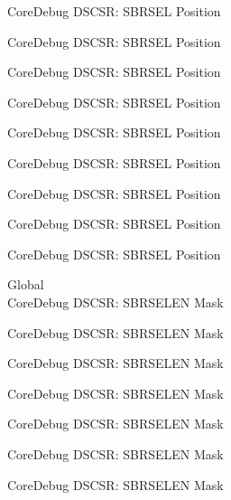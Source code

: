 \begin{DoxyRefList}
\label{deprecated__deprecated000648}%
%
Core\+Debug DSCSR\+: SBRSEL Position 

\label{deprecated__deprecated000773}%
%
Core\+Debug DSCSR\+: SBRSEL Position 

\label{deprecated__deprecated000827}%
%
Core\+Debug DSCSR\+: SBRSEL Position 

\label{deprecated__deprecated000903}%
%
Core\+Debug DSCSR\+: SBRSEL Position 

\label{deprecated__deprecated000966}%
%
Core\+Debug DSCSR\+: SBRSEL Position 

\label{deprecated__deprecated001045}%
%
Core\+Debug DSCSR\+: SBRSEL Position 

\label{deprecated__deprecated001121}%
%
Core\+Debug DSCSR\+: SBRSEL Position 

\label{deprecated__deprecated001224}%
%
Core\+Debug DSCSR\+: SBRSEL Position 

\label{deprecated__deprecated001326}%
%
Core\+Debug DSCSR\+: SBRSEL Position  
\item[Global \doxylink{group___c_m_s_i_s___s_c_b_ga5e5ed94cac1139165af161c008881805}{Core\+Debug\+\_\+\+DSCSR\+\_\+\+SBRSELEN\+\_\+\+Msk} ]\hfill \\
\label{deprecated__deprecated000098}%
%
Core\+Debug DSCSR\+: SBRSELEN Mask 

\label{deprecated__deprecated000152}%
%
Core\+Debug DSCSR\+: SBRSELEN Mask 

\label{deprecated__deprecated000228}%
%
Core\+Debug DSCSR\+: SBRSELEN Mask 

\label{deprecated__deprecated000291}%
%
Core\+Debug DSCSR\+: SBRSELEN Mask 

\label{deprecated__deprecated000370}%
%
Core\+Debug DSCSR\+: SBRSELEN Mask 

\label{deprecated__deprecated000446}%
%
Core\+Debug DSCSR\+: SBRSELEN Mask 

\label{deprecated__deprecated000549}%
%
Core\+Debug DSCSR\+: SBRSELEN Mask 


\end{DoxyRefList}
